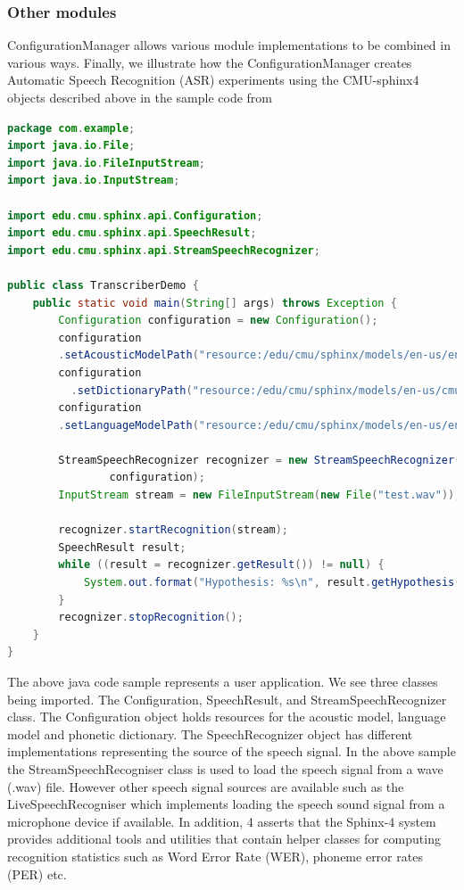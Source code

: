 \subsubsection{Other modules}
ConfigurationManager allows various module implementations to be combined in various ways.  Finally, we illustrate how the ConfigurationManager creates Automatic Speech Recognition (ASR) experiments using the CMU-sphinx4 objects described above in the sample code from \citep{Lamere03thecmu} 
\begin{lstlisting}[language=Java]
package com.example;
import java.io.File;
import java.io.FileInputStream;
import java.io.InputStream;

import edu.cmu.sphinx.api.Configuration;
import edu.cmu.sphinx.api.SpeechResult;
import edu.cmu.sphinx.api.StreamSpeechRecognizer;

public class TranscriberDemo {                                  
    public static void main(String[] args) throws Exception {      
        Configuration configuration = new Configuration();
        configuration
        .setAcousticModelPath("resource:/edu/cmu/sphinx/models/en-us/en-us");
        configuration
		  .setDictionaryPath("resource:/edu/cmu/sphinx/models/en-us/cmudict-en-us.dict");
        configuration
        .setLanguageModelPath("resource:/edu/cmu/sphinx/models/en-us/en-us.lm.bin");

        StreamSpeechRecognizer recognizer = new StreamSpeechRecognizer(
                configuration);
        InputStream stream = new FileInputStream(new File("test.wav"));

        recognizer.startRecognition(stream);
        SpeechResult result;
        while ((result = recognizer.getResult()) != null) {
            System.out.format("Hypothesis: %s\n", result.getHypothesis());
        }
        recognizer.stopRecognition();
    }
}
\end{lstlisting}
The above java code sample represents a user application.  We see three classes being imported. The Configuration, SpeechResult, and StreamSpeechRecognizer class.  The Configuration object holds resources for the acoustic model, language model and phonetic dictionary.  The SpeechRecognizer object has different implementations representing the source of the speech signal.  In the above sample the StreamSpeechRecogniser class is used to load the speech signal from a wave (.wav) file.  However other speech signal sources are available such as the LiveSpeechRecogniser which implements loading the speech sound signal from a microphone device if available.  In addition, \cite{walker2004sphinx} 4 asserts that the Sphinx-4 system provides additional tools and utilities that contain helper classes for computing recognition statistics such as Word Error Rate (WER), phoneme error rates (PER) etc.

